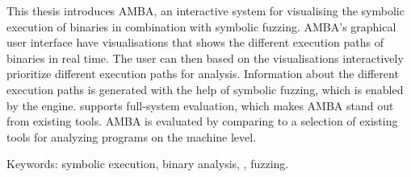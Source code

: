 This thesis introduces AMBA, an interactive system for visualising the symbolic execution of binaries in combination with symbolic fuzzing.
AMBA's graphical user interface have visualisations that shows the different execution paths of binaries in real time.
The user can then based on the visualisations interactively prioritize different execution paths for analysis.
Information about the different execution paths is generated with the help of symbolic fuzzing, which is enabled by the \stoe{} engine.
\stoe{} supports full-system evaluation, which makes AMBA stand out from existing tools.
AMBA is evaluated by comparing to a selection of existing tools for analyzing programs on the machine level.

Keywords: symbolic execution, binary analysis, \stoe{}, fuzzing.
